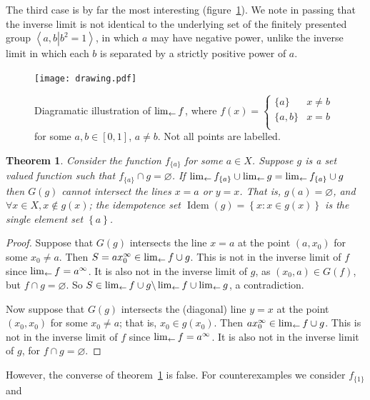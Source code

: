 \documentclass{article}
\newtheorem{thm}{Theorem}
\theoremstyle{definition}
\let\emptyset\varnothing
\begin{document}
The third case is by far the most interesting (figure~\ref{drawing}).
We note in passing that the inverse limit is not identical to the
underlying set of the finitely presented group $\left\langle
a,b\left|b^2=1\right.\right\rangle$, in which $a$ may have negative
power, unlike the inverse limit in which each $b$ is separated by a
strictly positive power of $a$.

\begin{figure}[h]
\centering
\texttt{[image: drawing.pdf]}
\caption[width=\textwidth]{Diagramatic illustration of 
  \label{drawing} $\lim_{\leftarrow} f$, where $f(x) = \begin{cases}
    \lbrace a\rbrace & x\neq b\\
    \lbrace a,b\rbrace & x=b\\
  \end{cases}$ for some $a,b\in[0,1]$, $a\neq b$.  Not all points are
  labelled.}
\end{figure}

\newcommand{\fa}{f_{\lbrace a\rbrace}}

\begin{thm}\label{fish}
Consider the function $\fa$ for some $a\in X$.  Suppose $g$ is a set
valued function such that $\fa\cap g=\emptyset$.  If
$\invlim{\fa}\cup\invlim{g} = \invlim{\fa\cup g}$ then $G(g)$ cannot
intersect the lines $x=a$ or $y=x$.  That is, $g(a)=\emptyset$, and
$\forall x\in X, x\notin g(x)$; the idempotence set
$\operatorname{Idem}(g)=\left\lbrace x\colon x\in g(x)\right\rbrace$
is the single element set $\left\lbrace a\right\rbrace$.
\end{thm}

\begin{proof}
Suppose that $G(g)$ intersects the line $x = a$ at the point $(a,x_0)$
for some $x_0\neq a$.  Then $S=ax_0^\infty\in\lim_{\leftarrow} f\cup g$.  This
is not in the inverse limit of $f$ since $\lim_{\leftarrow} f = a^\infty$.  It
is also not in the inverse limit of $g$, as $(x_0,a) \in G(f)$, but
$f\cap g=\emptyset$.  So $S\in\lim_{\leftarrow} f\cup
  g\backslash\lim_{\leftarrow} f\cup\lim_{\leftarrow} g$, a contradiction.

Now suppose that $G(g)$ intersects the (diagonal) line $y = x$ at the
point $(x_0,x_0)$ for some $x_0\neq a$; that is, $x_0\in g(x_0)$.
Then $ax_0^\infty\in \lim_{\leftarrow} f\cup g$.  This is not in the inverse
limit of $f$ since $\lim_{\leftarrow} f = a^\infty$.  It is also not in the
inverse limit of $g$, for $f\cap g=\emptyset$.  
\end{proof}


However, the converse of theorem~\ref{fish} is false.  For
counterexamples we consider $f_{\lbrace 1\rbrace}$ and
\end{document}
